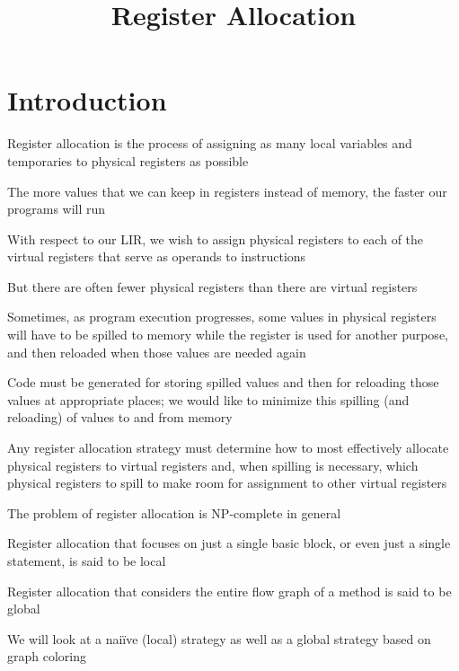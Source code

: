 \documentclass[8pt,a4paper,compress]{beamer}
\title{Register Allocation}
\date{}
\begin{document}
\begin{frame}
\vfill
\titlepage
\end{frame}

\section{Introduction}
\begin{frame}[fragile]
\pause

Register allocation is the process of assigning as many local variables and temporaries to physical registers as possible

\pause
\bigskip

The more values that we can keep in registers instead of memory, the faster our programs will run

\pause
\bigskip

With respect to our LIR, we wish to assign physical registers to each of the virtual registers that serve as operands to instructions

\pause
\bigskip

But there are often fewer physical registers than there are virtual registers

\pause
\bigskip

Sometimes, as program execution progresses, some values in physical registers will have to be spilled to memory while the register is used for another purpose, and then reloaded when those values are needed again

\pause
\bigskip

Code must be generated for storing spilled values and then for reloading those values at appropriate places; we would like to minimize this spilling (and reloading) of values to and from memory
\end{frame}

\begin{frame}[fragile]
\pause

Any register allocation strategy must determine how to most effectively allocate physical registers to virtual registers and, when spilling is necessary, which physical registers to spill to make room for assignment to other virtual registers

\pause
\bigskip

The problem of register allocation is NP-complete in general

\pause
\bigskip

Register allocation that focuses on just a single basic block, or even just a single statement,
is said to be local

\pause
\bigskip

Register allocation that considers the entire flow graph of a method is said to be global

\pause
\bigskip

We will look at a nai\"{i}ve (local) strategy as well as a global strategy based on graph coloring
\end{frame}
\end{document}
